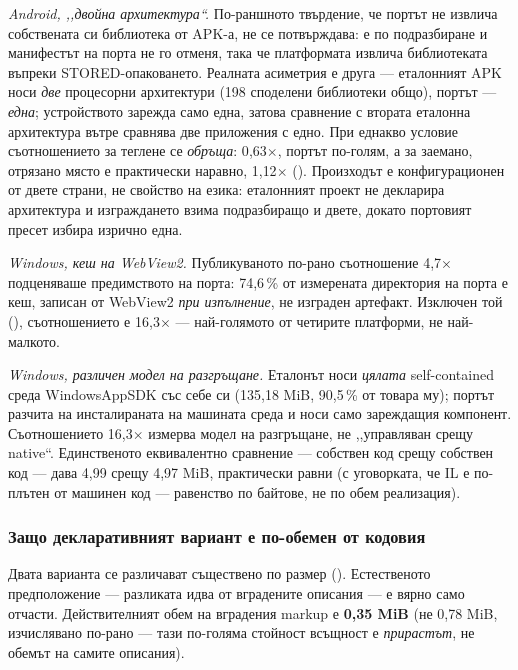 \emph{Android, ,,двойна архитектура“.} По-раншното твърдение, че портът не извлича собствената си
библиотека от APK-а, не се потвърждава:  е  по подразбиране и
манифестът на порта не го отменя, така че платформата извлича библиотеката въпреки
STORED-опаковането. Реалната асиметрия е друга --- еталонният APK носи \emph{две} процесорни
архитектури (198 споделени библиотеки общо), портът --- \emph{една}; устройството зарежда само
една, затова сравнение с втората еталонна архитектура вътре сравнява две приложения с едно. При
еднакво условие съотношението за теглене се \emph{обръща}: 0{,}63$\times$, портът по-голям, а за
заемано, отрязано място е практически наравно, 1{,}12$\times$ (). Произходът е
конфигурационен от двете страни, не свойство на езика: еталонният проект не декларира архитектура и
изграждането взима подразбиращо и двете, докато портовият пресет избира изрично една.

\emph{Windows, кеш на WebView2.} Публикуваното по-рано съотношение 4,7$\times$ подценяваше
предимството на порта: 74{,}6\,\% от измерената директория на порта е кеш, записан от WebView2
\emph{при изпълнение}, не изграден артефакт. Изключен той (), съотношението е
16{,}3$\times$ --- най-голямото от четирите платформи, не най-малкото.

\emph{Windows, различен модел на разгръщане.} Еталонът носи \emph{цялата} self-contained среда
WindowsAppSDK със себе си (135{,}18 MiB, 90{,}5\,\% от товара му); портът разчита на инсталираната
на машината среда и носи само зареждащия компонент. Съотношението 16{,}3$\times$ измерва модел на
разгръщане, не ,,управляван срещу native“. Единственото еквивалентно сравнение --- собствен код
срещу собствен код --- дава 4,99 срещу 4,97 MiB, практически равни (с уговорката, че IL е по-плътен
от машинен код --- равенство по байтове, не по обем реализация).

\subsubsection{Защо декларативният вариант е по-обемен от кодовия}

Двата варианта се различават съществено по размер (). Естественото предположение
--- разликата идва от вградените описания --- е вярно само отчасти. Действителният обем на
вградения markup е \textbf{0,35 MiB} (не 0,78 MiB, изчислявано по-рано --- тази по-голяма стойност
всъщност е \emph{прирастът}, не обемът на самите описания).

